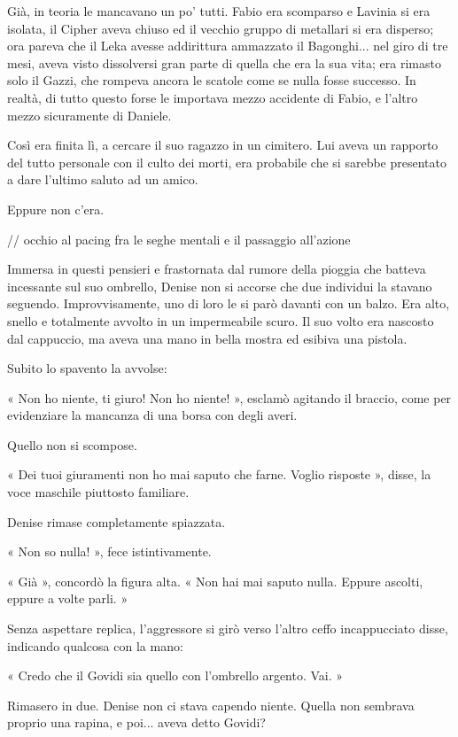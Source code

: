 Già, in teoria le mancavano un po' tutti. Fabio era scomparso e Lavinia si era isolata, il Cipher aveva chiuso ed il vecchio gruppo di metallari si era disperso; ora pareva che il Leka avesse addirittura ammazzato il Bagonghi... nel giro di tre mesi, aveva visto dissolversi gran parte di quella che era la sua vita; era rimasto solo il Gazzi, che rompeva ancora le scatole come se nulla fosse successo. In realtà, di tutto questo forse le importava mezzo accidente di Fabio, e l'altro mezzo sicuramente di Daniele.

Così era finita lì, a cercare il suo ragazzo in un cimitero. Lui aveva un rapporto del tutto personale con il culto dei morti, era probabile che si sarebbe presentato a dare l'ultimo saluto ad un amico.

Eppure non c'era.

// occhio al pacing fra le seghe mentali e il passaggio all'azione

Immersa in questi pensieri e frastornata dal rumore della pioggia che batteva incessante sul suo ombrello, Denise non si accorse che due individui la stavano seguendo. Improvvisamente, uno di loro le si parò davanti con un balzo. Era alto, snello e totalmente avvolto in un impermeabile scuro. Il suo volto era nascosto dal cappuccio, ma aveva una mano in bella mostra ed esibiva una pistola.

Subito lo spavento la avvolse:

« Non ho niente, ti giuro! Non ho niente! », esclamò agitando il braccio, come per evidenziare la mancanza di una borsa con degli averi.

Quello non si scompose.

« Dei tuoi giuramenti non ho mai saputo che farne. Voglio risposte », disse, la voce maschile piuttosto familiare.

Denise rimase completamente spiazzata.

« Non so nulla! », fece istintivamente.

« Già », concordò la figura alta. « Non hai mai saputo nulla. Eppure ascolti, eppure a volte parli. »

Senza aspettare replica, l'aggressore si girò verso l'altro ceffo incappucciato disse, indicando qualcosa con la mano:

« Credo che il Govidi sia quello con l'ombrello argento. Vai. »

Rimasero in due. Denise non ci stava capendo niente. Quella non sembrava proprio una rapina, e poi... aveva detto Govidi?

